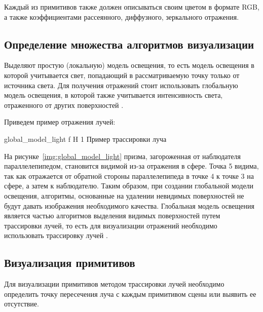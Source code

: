 Каждый из примитивов также должен описываться своим цветом в формате RGB, а также
коэффициентами рассеянного, диффузного, зеркального отражения.



\subsection{Определение множества алгоритмов визуализации}
Выделяют простую (локальную) модель освещения, то есть модель освещения в которой учитывается свет, попадающий в рассматриваемую точку только от источника света.
Для получения отражений стоит использовать глобальную модель освещения, в которой также учитывается интенсивность света, отраженного от других поверхностей \cite{Rodgers}.

Приведем пример отражения лучей:

{global_model_light} %
{f} %
{H} %
{1\textwidth} %
{Пример трассировки луча} %



На рисунке~\ref{img:global_model_light}  призма, загороженная от наблюдателя параллелепипедом, становится видимой из-за отражения в сфере.
Точка 5 видима, так как отражается от обратной стороны параллелепипеда в точке 4 к точке 3 на сфере, а затем к наблюдателю.
Таким образом, при создании глобальной модели освещения, алгоритмы, основанные на удалении невидимых поверхностей не будут давать изображения необходимого качества.
Глобальная модель освещения является частью алгоритмов выделения видимых поверхностей путем трассировки лучей, то есть для визуализации отражений необходимо использовать трассировку лучей \cite{Rodgers}.

\subsection{Визуализация примитивов}
Для визуализации примитивов методом трассировки лучей необходимо определить точку пересечения луча с каждым примитивом сцены или выявить ее отсутствие.

